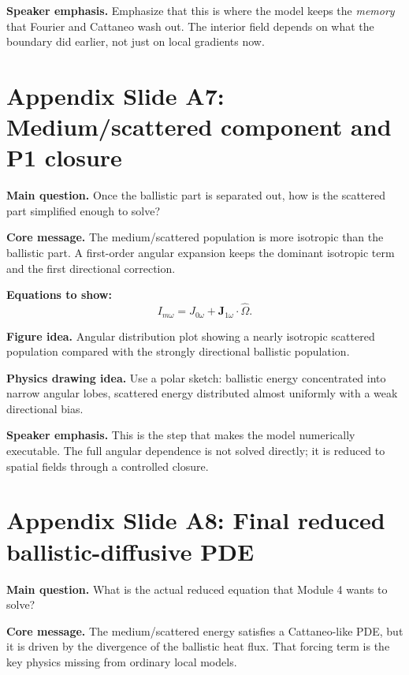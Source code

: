 \documentclass[11pt]{article}
\begin{document}
\textbf{Speaker emphasis.} Emphasize that this is where the model keeps the \emph{memory} that Fourier and Cattaneo wash out. The interior field depends on what the boundary did earlier, not just on local gradients now.

\section{Appendix Slide A7: Medium/scattered component and P1 closure}
\begin{physicsbox}
\textbf{Main question.} Once the ballistic part is separated out, how is the scattered part simplified enough to solve?
\end{physicsbox}

\textbf{Core message.} The medium/scattered population is more isotropic than the ballistic part. A first-order angular expansion keeps the dominant isotropic term and the first directional correction.

\textbf{Equations to show:}
\begin{equation*}
I_{m\omega}=J_{0\omega}+\bm{J}_{1\omega}\cdot\hat{\Omega}.
\end{equation*}

\textbf{Figure idea.} Angular distribution plot showing a nearly isotropic scattered population compared with the strongly directional ballistic population.

\textbf{Physics drawing idea.} Use a polar sketch: ballistic energy concentrated into narrow angular lobes, scattered energy distributed almost uniformly with a weak directional bias.

\textbf{Speaker emphasis.} This is the step that makes the model numerically executable. The full angular dependence is not solved directly; it is reduced to spatial fields through a controlled closure.

\section{Appendix Slide A8: Final reduced ballistic-diffusive PDE}
\begin{physicsbox}
\textbf{Main question.} What is the actual reduced equation that Module 4 wants to solve?
\end{physicsbox}

\textbf{Core message.} The medium/scattered energy satisfies a Cattaneo-like PDE, but it is driven by the divergence of the ballistic heat flux. That forcing term is the key physics missing from ordinary local models.
\end{document}
